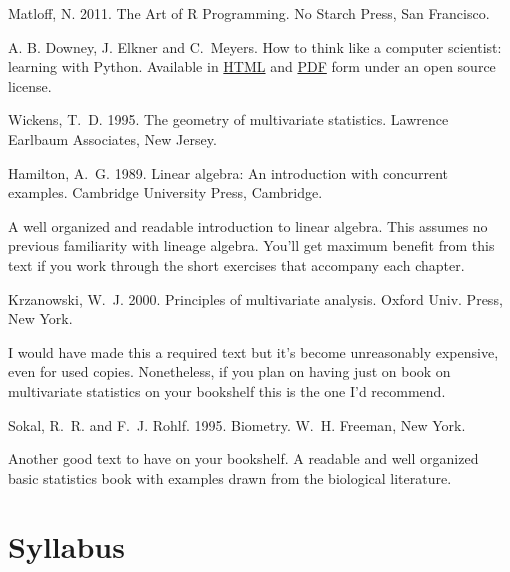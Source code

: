 \documentclass[11pt,letterpaper]{article}
\begin{document}
\renewcommand{\refname}{Texts}
\begin{thebibliography}{99}

 Matloff, N. 2011. The Art of R Programming. No Starch Press, San Francisco.

A. B. Downey, J. Elkner  and C.\ Meyers. How to think like a computer scientist: learning with Python. Available in \href{http://www.greenteapress.com/thinkpython/html/index.html}{HTML} and \href{http://www.greenteapress.com/thinkpython/thinkpython.pdf}{PDF} form under an open source license.

 Wickens, T.\ D. 1995. The geometry of multivariate statistics. Lawrence Earlbaum Associates, New Jersey. 

\end{thebibliography}

\renewcommand{\refname}{Other Recommended Texts}

\begin{thebibliography}{99}
\setcounter{enumiv}{5}
 Hamilton, A.\ G. 1989. Linear algebra: An introduction with concurrent examples. Cambridge University Press, Cambridge.

A well organized and readable introduction to linear algebra. This assumes no previous familiarity with lineage algebra.  You'll get maximum benefit from this text if you work through the short exercises that accompany each chapter.

 Krzanowski, W.\ J. 2000. Principles of multivariate analysis. Oxford Univ. Press, New York.

I would have made this a required text but it's become unreasonably expensive, even for used copies. Nonetheless, if you plan on having just on book on multivariate statistics on your bookshelf this is the one I'd recommend.

 Sokal, R.\ R. and F.\ J. Rohlf. 1995. Biometry. W.\ H. Freeman, New York.

Another good text to have on your bookshelf. A readable and well organized basic statistics book with examples drawn from the biological literature.

\end{thebibliography}

\section*{Syllabus}
\end{document}
